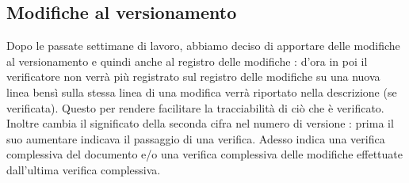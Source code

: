 \subsection{Modifiche al versionamento}
Dopo le passate settimane di lavoro, abbiamo deciso di apportare delle modifiche al versionamento e quindi anche al registro delle modifiche : d'ora in poi il verificatore non verrà più registrato sul registro delle modifiche su una nuova linea bensì sulla stessa linea di una modifica verrà riportato nella descrizione (se verificata). Questo per rendere facilitare la tracciabilità di ciò che è verificato. Inoltre cambia il significato della seconda cifra nel numero di versione : prima il suo aumentare indicava il passaggio di una verifica. Adesso indica una verifica complessiva del documento e/o una verifica complessiva delle modifiche effettuate dall'ultima verifica complessiva. 